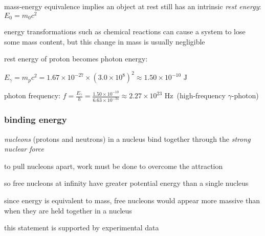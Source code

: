 mass-energy equivalence implies an object at rest still has an intrinsic \emph{rest energy}: $E_0 = m_0 c^2$

\cmt energy transformations such as chemical reactions can cause a system to lose some mass content, but this change in mass is usually negligible

\newpage


\sol rest energy of proton becomes photon energy:

{

\centering

$E_\gamma=m_pc^2 = 1.67\times10^{-27} \times (3.0\times10^8)^2 \approx 1.50\times10^{-10} \text{ J}$

}

photon frequency: $f=\frac{E_\gamma}{h} = \frac{1.50\times10^{-10}}{6.63\times10^{-34}} \approx 2.27 \times10^{23} \text{ Hz}\,$ (high-frequency $\gamma$-photon) \eoe





\subsubsection{binding energy}

\emph{nucleons} (protons and neutrons) in a nucleus bind together through the \emph{strong nuclear force}

to pull nucleons apart, work must be done to overcome the attraction

so free nucleons at infinity have greater potential energy than a single nucleus

since energy is equivalent to mass, free nucleons would appear more massive than when they are held together in a nucleus

this statement is supported by experimental data

